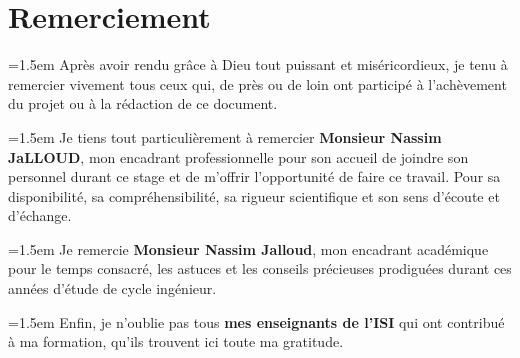 \chapter*{Remerciement}
\begin{center}
    

\par \parindent=1.5em Après avoir rendu grâce à Dieu tout puissant et miséricordieux, je tenu à remercier vivement tous ceux
qui, de près ou de loin ont participé à l’achèvement du projet ou à la rédaction de ce document. 
\vspace{0.5cm}
\par \parindent=1.5em Je tiens tout particulièrement à remercier\textbf{ Monsieur Nassim JaLLOUD}, mon encadrant professionnelle
pour son accueil de joindre son personnel durant ce stage et de m'offrir l’opportunité de faire ce
travail. Pour sa disponibilité, sa compréhensibilité, sa rigueur scientifique et son sens d’écoute et
d’échange.
\vspace{0.5cm}
\par \parindent=1.5em Je remercie \textbf{ Monsieur Nassim Jalloud}, mon encadrant académique pour le temps consacré, les astuces et les conseils précieuses prodiguées durant ces années d'étude de cycle ingénieur.
\vspace{0.5cm}

\par \parindent=1.5em Enfin, je n’oublie pas tous \textbf{mes enseignants de l’ISI} qui ont contribué à ma formation, qu’ils trouvent ici toute ma gratitude.
\end{center}
\begin{flushright}
    \LARGE \@author
\end{flushright}